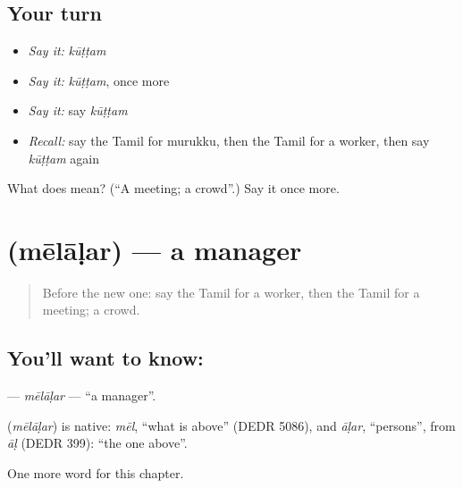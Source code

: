 \subsection*{Your turn}
\begin{itemize}
\raggedright
  \item \emph{Say it:} \emph{kūṭṭam}
  \item \emph{Say it:} \emph{kūṭṭam}, once more
  \item \emph{Say it:} say \emph{kūṭṭam}
  \item \emph{Recall:} say the Tamil for murukku, then the Tamil for a worker, then say \emph{kūṭṭam} again
\end{itemize}

\begin{tcolorbox}[breakable,colback=teal!4,colframe=teal!35!black,title={Before you move on}]
What does  mean? (\textquotedblleft{}A meeting; a crowd\textquotedblright{}.) Say it once more.
\end{tcolorbox}
\section[\texorpdfstring{\ta{மேலாளர்} (mēlāḷar)}{மேலாளர் (mēlāḷar)}]{ (mēlāḷar) — a manager}

\label{lesson:TA-C279-melalar}



\begin{quote}
Before the new one: say the Tamil for a worker, then the Tamil for a meeting; a crowd.
\end{quote}

\subsection*{You'll want to know: }
\textbf{} — \emph{mēlāḷar} — \textquotedblleft{}a manager\textquotedblright{}.

\begin{cousinweb}
\textbf{} (\emph{mēlāḷar}) is native: \emph{mēl}, \textquotedblleft{}what is above\textquotedblright{} (DEDR 5086), and \emph{āḷar}, \textquotedblleft{}persons\textquotedblright{}, from \emph{āḷ} (DEDR 399): \textquotedblleft{}the one above\textquotedblright{}.
\end{cousinweb}

\begin{grammarlens}[title={What you've built}]
One more word for this chapter.
\end{grammarlens}

